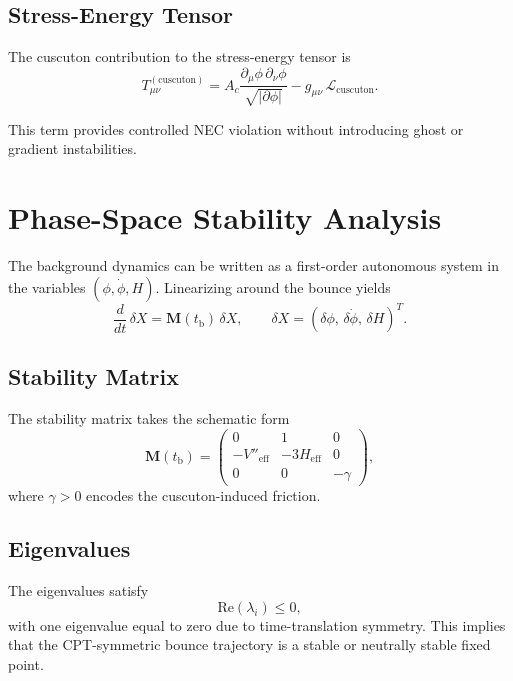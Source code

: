 \documentclass[11pt,a4paper]{article}
\begin{document}
\subsection{Stress-Energy Tensor}

The cuscuton contribution to the stress-energy tensor is
\begin{equation}
T^{(\mathrm{cuscuton})}_{\mu\nu}
    = A_{c}
      \frac{\partial_{\mu}\phi\,\partial_{\nu}\phi}
           {\sqrt{|\partial\phi|}}
      - g_{\mu\nu}\,\mathcal{L}_{\mathrm{cuscuton}}.
\end{equation}

This term provides controlled NEC violation without introducing ghost or
gradient instabilities.


\section{Phase-Space Stability Analysis}
\label{app:phase}

The background dynamics can be written as a first-order autonomous system in the
variables \((\phi, \dot{\phi}, H)\). Linearizing around the bounce yields
\begin{equation}
\frac{d}{dt}\,\delta X
    = \mathbf{M}(t_{\mathrm{b}})\,\delta X,
\qquad
\delta X
    = (\delta\phi,\,\delta\dot{\phi},\,\delta H)^{T}.
\end{equation}

\subsection{Stability Matrix}

The stability matrix takes the schematic form
\begin{equation}
\mathbf{M}(t_{\mathrm{b}})
    =
    \begin{pmatrix}
        0 & 1 & 0 \\
        -V''_{\mathrm{eff}} & -3H_{\mathrm{eff}} & 0 \\
        0 & 0 & -\gamma
    \end{pmatrix},
\end{equation}
where \(\gamma > 0\) encodes the cuscuton-induced friction.

\subsection{Eigenvalues}

The eigenvalues satisfy
\begin{equation}
\mathrm{Re}(\lambda_{i}) \leq 0,
\end{equation}
with one eigenvalue equal to zero due to time-translation symmetry. This implies
that the CPT-symmetric bounce trajectory is a stable or neutrally stable fixed
point.
\end{document}
